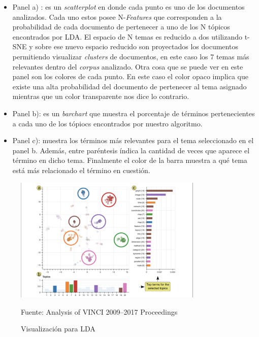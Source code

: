     \begin{itemize}
        \item Panel a) : es un \textit{scatterplot} en donde cada punto es uno de los documentos analizados. Cada uno estos posee N-\textit{Features} que corresponden a la probabilidad de cada documento de pertenecer a uno de los N tópicos encontrados por LDA. El espacio de N temas es reducido a dos utilizando t-SNE y sobre ese nuevo espacio reducido son proyectados los documentos permitiendo visualizar \textit{clusters} de documentos, en este caso los 7 temas más relevantes dentro del \textit{corpus} analizado. Otra cosa que se puede ver en este panel son los colores de cada punto. En este caso el color opaco implica que existe una alta probabilidad del documento de pertenecer al tema asignado mientras que un color transparente nos dice lo contrario.
        
        \item Panel b): es un \textit{barchart} que muestra el porcentaje de términos pertenecientes a cada uno de los tópiocs encontrados por nuestro algoritmo.
        
        \item Panel c): muestra los términos más relevantes para el tema seleccionado en el panel b. Además, entre paréntesis índica la cantidad de veces que aparece el término en dicho tema. Finalmente el color de la barra muestra a qué tema está más relacionado el término en cuestión.
    \end{itemize}
    
    \begin{figure}[H]
        \centering
        \includegraphics[width=0.8\textwidth]{figures/AnalisisVinci.png}
        \caption{\label{fig:Vinci} Visualización para LDA} Fuente: Analysis of VINCI 2009–2017 Proceedings \cite{kucher2018analysis}
    \end{figure}
    
